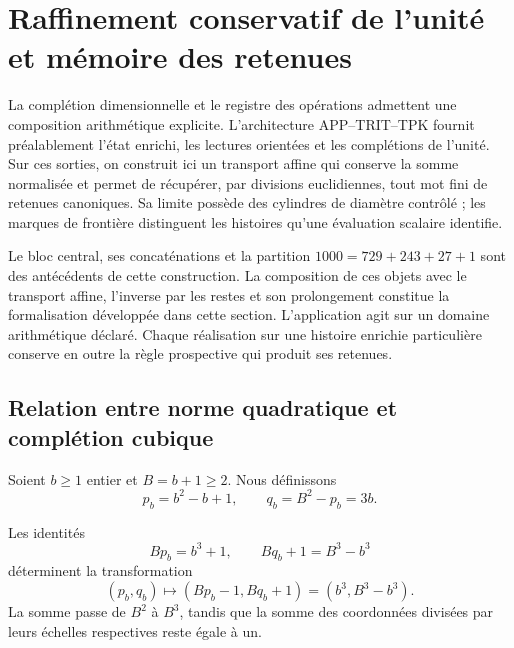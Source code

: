 \chapter{Raffinement conservatif de l’unité et mémoire des retenues}
\label{x_reciprocidad:lib03:refinamiento}

La complétion dimensionnelle et le registre des opérations admettent une composition arithmétique explicite. L'architecture APP--TRIT--TPK fournit préalablement l'état enrichi, les lectures orientées et les complétions de l'unité. Sur ces sorties, on construit ici un transport affine qui conserve la somme normalisée et permet de récupérer, par divisions euclidiennes, tout mot fini de retenues canoniques. Sa limite possède des cylindres de diamètre contrôlé ; les marques de frontière distinguent les histoires qu'une évaluation scalaire identifie.

Le bloc central, ses concaténations et la partition
\(1000=729+243+27+1\) sont des antécédents de cette construction. La composition
de ces objets avec le transport affine, l’inverse par les restes et son
prolongement constitue la formalisation développée dans cette section.
L’application agit sur un domaine arithmétique déclaré. Chaque réalisation
sur une histoire enrichie particulière conserve en outre la règle
prospective qui produit ses retenues.

\section{Relation entre norme quadratique et complétion cubique}
\label{x_reciprocidad:lib03:completacion}

Soient \(b\geq1\) entier et \(B=b+1\geq2\). Nous définissons
\begin{equation}
 p_b=b^2-b+1,\qquad q_b=B^2-p_b=3b.
 \label{x_reciprocidad:lib03:pb}
\end{equation}

\begin{proposition}
\label{x_reciprocidad:lib03:prop-completacion}
Les identités
\begin{equation}
 Bp_b=b^3+1,\qquad Bq_b+1=B^3-b^3
 \label{x_reciprocidad:lib03:cuadratica-cubica}
\end{equation}
déterminent la transformation
\begin{equation}
 (p_b,q_b)\longmapsto(Bp_b-1,Bq_b+1)
       =(b^3,B^3-b^3).
 \label{x_reciprocidad:lib03:transferencia-cubica}
\end{equation}
La somme passe de \(B^2\) à \(B^3\), tandis que la somme des
coordonnées divisées par leurs échelles respectives reste égale à un.
\end{proposition}


